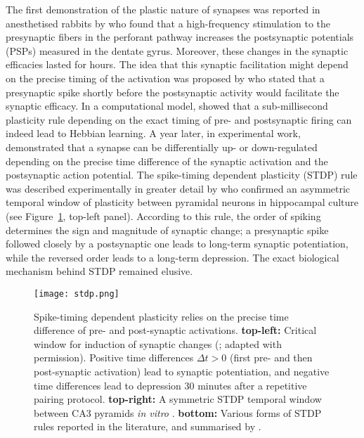     The first demonstration of the plastic nature of synapses was reported
    in anesthetised rabbits by \cite{Lomo1966} who found that a high-frequency
    stimulation to the presynaptic fibers in the perforant pathway increases
    the postsynaptic potentials (PSPs) measured in the dentate gyrus. Moreover,
    these changes in the synaptic efficacies lasted for hours. The idea that
    this synaptic facilitation might depend on the precise timing of the activation
    was proposed by \cite{Taylor1973} who stated that a presynaptic spike
    shortly before the postsynaptic activity would facilitate the synaptic
    efficacy. In a computational model, \cite{Gerstner1996} showed that a
    sub-millisecond plasticity rule depending on the exact timing of pre- and
    postsynaptic firing can indeed lead to Hebbian learning. A
    year later, in experimental work, \cite{Markram1997} demonstrated that a synapse
    can be differentially up- or down-regulated depending on the precise time
    difference of the synaptic activation and the postsynaptic action
    potential. The spike-timing dependent plasticity (STDP) rule was described
    experimentally in greater detail by \cite{Bi1998} who confirmed an
    asymmetric temporal window of plasticity between pyramidal neurons in
    hippocampal culture (see Figure~\ref{fig:stdp}, top-left panel). According to this
    rule, the order of spiking determines the sign and magnitude of synaptic
    change; a presynaptic spike followed closely by a postsynaptic one leads to
    long-term synaptic potentiation, while the reversed order leads to a
    long-term depression. The exact biological mechanism behind STDP remained
    elusive.

    \begin{figure}
      \center
      \texttt{[image: stdp.png]}
      \caption{
        Spike-timing dependent plasticity relies on the precise time
        difference of pre- and post-synaptic activations. {\bf top-left:}
        Critical window for induction of synaptic changes (\citealp{Bi1998}; adapted with permission).
        Positive time differences $\Delta t >0$ (first pre- and
        then post-synaptic activation) lead to synaptic potentiation, and
        negative time differences lead to depression 30 minutes after a
        repetitive pairing protocol. {\bf top-right:} A symmetric STDP temporal
        window between CA3 pyramids {\it in vitro} \citep{Mishra2016}. {\bf
        bottom:} Various forms of STDP rules reported in the literature, and
        summarised by \cite{Feldman2012}.
             }
    \label{fig:stdp}
    \end{figure}

